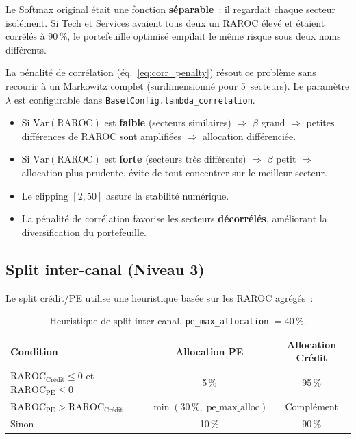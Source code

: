 \documentclass[12pt,a4paper]{article}
\begin{document}
\begin{warningbox}
Le Softmax original \'etait une fonction \textbf{s\'eparable}~: il regardait chaque secteur isol\'ement. Si Tech et Services avaient tous deux un RAROC \'elev\'e et \'etaient corr\'el\'es \`a 90\,\%, le portefeuille optimis\'e empilait le m\^eme risque sous deux noms diff\'erents.

La p\'enalit\'e de corr\'elation (\'eq.~\ref{eq:corr_penalty}) r\'esout ce probl\`eme sans recourir \`a un Markowitz complet (surdimensionn\'e pour 5~secteurs). Le param\`etre $\lambda$ est configurable dans \texttt{BaselConfig.lambda\_correlation}.
\end{warningbox}

\begin{interpretbox}
\begin{itemize}[nosep]
    \item Si $\text{Var}(\text{RAROC})$ est \textbf{faible} (secteurs similaires) $\Rightarrow$ $\beta$ grand $\Rightarrow$ petites diff\'erences de RAROC sont amplifi\'ees $\Rightarrow$ allocation diff\'erenci\'ee.
    \item Si $\text{Var}(\text{RAROC})$ est \textbf{forte} (secteurs tr\`es diff\'erents) $\Rightarrow$ $\beta$ petit $\Rightarrow$ allocation plus prudente, \'evite de tout concentrer sur le meilleur secteur.
    \item Le clipping $[2, 50]$ assure la stabilit\'e num\'erique.
    \item La p\'enalit\'e de corr\'elation favorise les secteurs \textbf{d\'ecorr\'el\'es}, am\'eliorant la diversification du portefeuille.
\end{itemize}
\end{interpretbox}

\subsection{Split inter-canal (Niveau 3)}

Le split cr\'edit/PE utilise une heuristique bas\'ee sur les RAROC agr\'eg\'es~:

\begin{table}[h]
\centering
\begin{tabular}{lcc}
\toprule
\textbf{Condition} & \textbf{Allocation PE} & \textbf{Allocation Cr\'edit} \\
\midrule
$\text{RAROC}_{\text{Cr\'edit}} \leq 0$ et $\text{RAROC}_{\text{PE}} \leq 0$ & 5\,\% & 95\,\% \\
$\text{RAROC}_{\text{PE}} > \text{RAROC}_{\text{Cr\'edit}}$ & $\min(30\,\%,\; \text{pe\_max\_alloc})$ & Compl\'ement \\
Sinon & 10\,\% & 90\,\% \\
\bottomrule
\end{tabular}
\caption{Heuristique de split inter-canal. \texttt{pe\_max\_allocation} $= 40\,\%$.}
\label{tab:split}
\end{table}
\end{document}
